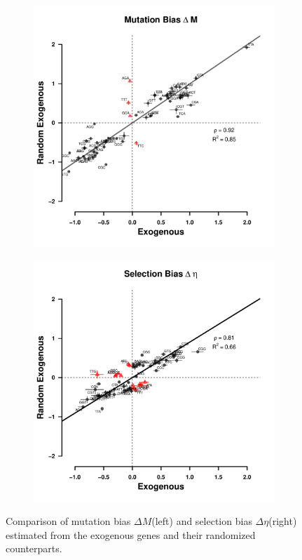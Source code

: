 \documentclass[doublespacing,linenumbers]{bmcart-modified}
\newcommand{\DM}{\ensuremath{{\Delta M}}\xspace}
\newcommand{\DE}{\ensuremath{{\Delta \eta}}\xspace}
\begin{document}
\begin{backmatter}
\begin{figure}
    \centering
    \begin{subfigure}
        \centering
        \includegraphics[width=.45\textwidth]{img/figS11a.pdf}
    \end{subfigure}
    \begin{subfigure}
        \centering
        \includegraphics[width=.45\textwidth]{img/figS11b.pdf}
    \end{subfigure}
    \caption{Comparison of mutation bias \DM (left) and selection bias \DE (right) estimated from the exogenous genes and their randomized counterparts. }
    \label{fig:rnd_exo}
\end{figure}
\null
\vfill




\end{backmatter}
\end{document}
